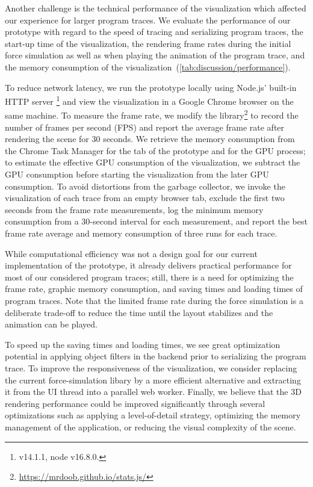 Another challenge is the technical performance of the visualization which affected our experience for larger program traces.
We evaluate the performance of our prototype with regard to the speed of tracing and serializing program traces, the start-up time of the visualization, the rendering frame rates during the initial force simulation as well as when playing the animation of the program trace, and the memory consumption of the visualization~(\cref{tab:discussion/performance}).

To reduce network latency, we run the \tfd{} prototype locally using Node.js' built-in HTTP server \footnote{ v14.1.1, node v16.8.0.} and view the visualization in a Google Chrome browser on the same machine.
To measure the frame rate, we modify the  library\footnote{\url{https://mrdoob.github.io/stats.js/}} to record the number of frames per second (FPS) and report the average frame rate after rendering the scene for 30 seconds.
We retrieve the memory consumption from the Chrome Task Manager for the tab of the \tfd{} prototype and for the GPU process; to estimate the effective GPU consumption of the visualization, we subtract the GPU consumption before starting the visualization from the later GPU consumption.
To avoid distortions from the garbage collector, we invoke the visualization of each trace from an empty browser tab, exclude the first two seconds from the frame rate measurements, log the minimum memory consumption from a 30-second interval for each measurement, and report the best frame rate average and memory consumption of three runs for each trace.

While computational efficiency was not a design goal for our current implementation of the \tfd{} prototype, it already delivers practical performance for most of our considered program traces; still, there is a need for optimizing the frame rate, graphic memory consumption, and saving times and loading times of program traces.
Note that the limited frame rate during the force simulation is a deliberate trade-off to reduce the time until the layout stabilizes and the animation can be played.

To speed up the saving times and loading times, we see great optimization potential in applying object filters in the backend prior to serializing the program trace.
To improve the responsiveness of the visualization, we consider replacing the current force-simulation libary  by a more efficient alternative and extracting it from the UI thread into a parallel web worker.
Finally, we believe that the 3D rendering performance could be improved significantly through several optimizations such as applying a level-of-detail strategy, optimizing the memory management of the application, or reducing the visual complexity of the scene.
